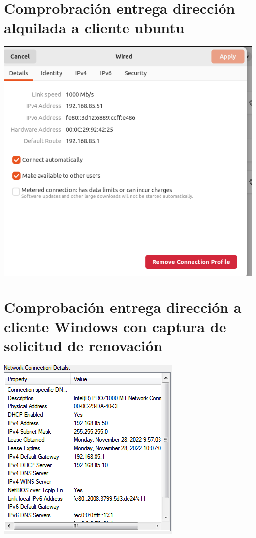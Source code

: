 \documentclass[a4paper,12pt]{article} %
\begin{document}
\section{Comprobración entrega dirección alquilada a cliente ubuntu}
\includegraphics{15.png}


\section{Comprobación entrega dirección a cliente Windows con captura de solicitud de renovación}
\includegraphics{14.png}
\end{document}
